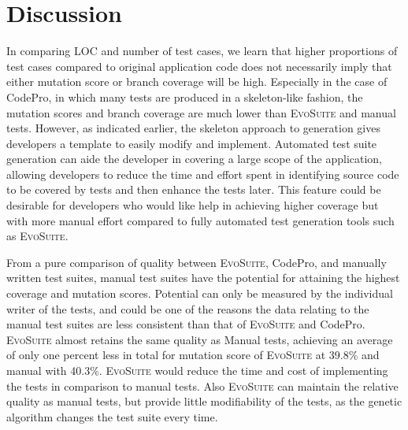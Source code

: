 
\section{Discussion}
\label{sec:discussion}
In comparing LOC and number of test cases, we learn that higher proportions of test cases compared to original application code does not necessarily imply that either mutation score or branch coverage will be high.  Especially in the case of CodePro, in which many tests are produced in a skeleton-like fashion, the mutation scores and branch coverage are much lower than  \textsc{EvoSuite} and manual tests. However, as indicated earlier, the skeleton approach to generation gives developers a template to easily modify and implement. Automated test suite generation can aide the developer in covering a large scope of the application, allowing developers to reduce the time and effort spent in identifying source code to be covered by tests and then enhance the tests later.  This feature could be desirable for developers who would like help in achieving higher coverage but with more manual effort compared to fully automated test generation tools such as \textsc{EvoSuite}.

From a pure comparison of quality between \textsc{EvoSuite}, CodePro, and manually written test suites, manual test suites have the potential for attaining the highest coverage and mutation scores. Potential can only be measured by the individual writer of the tests, and could be one of the reasons the data relating to the manual test suites are less consistent than that of \textsc{EvoSuite} and CodePro. \textsc{EvoSuite} almost retains the same quality as Manual tests, achieving an average of only one percent less in total for mutation score of \textsc{EvoSuite} at 39.8\%  and manual with 40.3\%. \textsc{EvoSuite} would reduce the time and cost of implementing the tests in comparison to manual tests. Also \textsc{EvoSuite} can maintain the relative quality as manual tests, but provide little modifiability of the tests, as the genetic algorithm changes the test suite every time.
